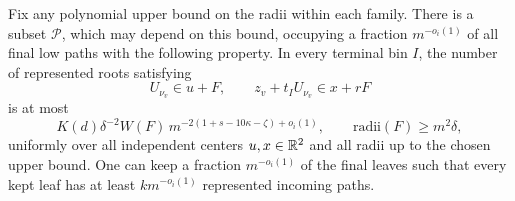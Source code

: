 \begin{lemma}\label{ext:represented}
Fix any polynomial upper bound on the radii within each family.
There is a subset \(\mathcal P\), which may depend on this bound,
occupying a fraction \(m^{-o_i(1)}\) of all final low paths with the
following property. In every terminal bin \(I\), the number of
represented roots satisfying
\[
 U_{\nu_v}\in u+F,\qquad z_v+t_IU_{\nu_v}\in x+rF
\]
is at most
\begin{equation}\label{eq:source-41}
 K(d)\delta^{-2}W(F)\,
          m^{-2(1+s-10\kappa-\zeta)+o_i(1)},
 \qquad \text{radii}(F)\geq m^2\delta,
\end{equation}
uniformly over all independent centers \(u,x\in\mathbb R^2\) and all radii
up to the chosen upper bound.
One can keep a fraction \(m^{-o_i(1)}\) of the final leaves such
that every kept leaf has at least \(k m^{-o_i(1)}\)
represented incoming paths.
\end{lemma}


